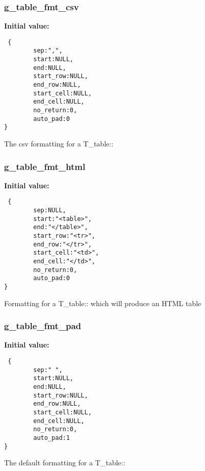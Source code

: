 \subsubsection{ g\_\-table\_\-fmt\_\-csv}\label{group__simple__table_a1}


{\bf Initial value:}

\footnotesize\begin{verbatim} {
        sep:",",
        start:NULL,
        end:NULL,
        start_row:NULL,
        end_row:NULL,
        start_cell:NULL,
        end_cell:NULL,
        no_return:0,
        auto_pad:0
}\end{verbatim}\normalsize 
The csv formatting for a T\_\-table:: 
\subsubsection{ g\_\-table\_\-fmt\_\-html}\label{group__simple__table_a2}


{\bf Initial value:}

\footnotesize\begin{verbatim} {
        sep:NULL,
        start:"<table>",
        end:"</table>",
        start_row:"<tr>",
        end_row:"</tr>",
        start_cell:"<td>",
        end_cell:"</td>",
        no_return:0,
        auto_pad:0
}\end{verbatim}\normalsize 
Formatting for a T\_\-table:: which will produce an HTML table 
\subsubsection{ g\_\-table\_\-fmt\_\-pad}\label{group__simple__table_a0}


{\bf Initial value:}

\footnotesize\begin{verbatim} {
        sep:" ",
        start:NULL,
        end:NULL,
        start_row:NULL,
        end_row:NULL,
        start_cell:NULL,
        end_cell:NULL,
        no_return:0,
        auto_pad:1
}\end{verbatim}\normalsize 
The default formatting for a T\_\-table:: 
